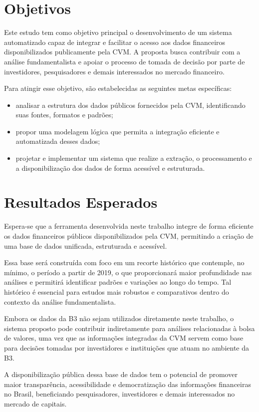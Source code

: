 \section{Objetivos}

Este estudo tem como objetivo principal o desenvolvimento de um sistema automatizado capaz de integrar e facilitar o acesso aos dados financeiros disponibilizados publicamente pela CVM. A proposta busca contribuir com a análise fundamentalista e apoiar o processo de tomada de decisão por parte de investidores, pesquisadores e demais interessados no mercado financeiro.

Para atingir esse objetivo, são estabelecidas as seguintes metas específicas:

\begin{itemize} 
	\item analisar a estrutura dos dados públicos fornecidos pela CVM, identificando suas fontes, formatos e padrões; 
	\item propor uma modelagem lógica que permita a integração eficiente e automatizada desses dados; 
	\item projetar e implementar um sistema que realize a extração, o processamento e a disponibilização dos dados de forma acessível e estruturada. 
\end{itemize}


\section{Resultados Esperados}

Espera-se que a ferramenta desenvolvida neste trabalho integre de forma eficiente os dados financeiros públicos disponibilizados pela CVM, permitindo a criação de uma base de dados unificada, estruturada e acessível.

Essa base será construída com foco em um recorte histórico que contemple, no mínimo, o período a partir de 2019, o que proporcionará maior profundidade nas análises e permitirá identificar padrões e variações ao longo do tempo. Tal histórico é essencial para estudos mais robustos e comparativos dentro do contexto da análise fundamentalista.

Embora os dados da B3 não sejam utilizados diretamente neste trabalho, o sistema proposto pode contribuir indiretamente para análises relacionadas à bolsa de valores, uma vez que as informações integradas da CVM servem como base para decisões tomadas por investidores e instituições que atuam no ambiente da B3.

A disponibilização pública dessa base de dados tem o potencial de promover maior transparência, acessibilidade e democratização das informações financeiras no Brasil, beneficiando pesquisadores, investidores e demais interessados no mercado de capitais.